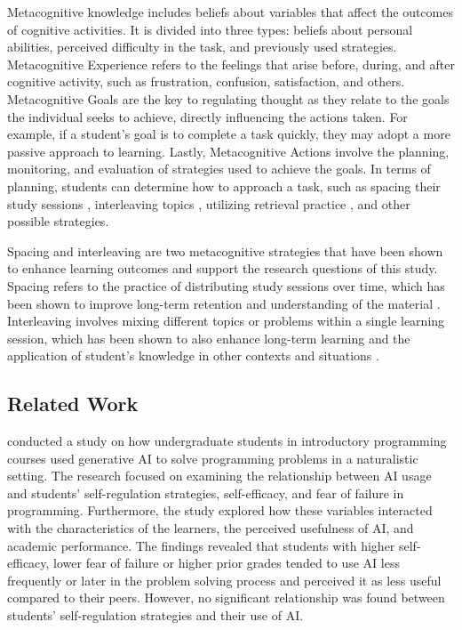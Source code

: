 \documentclass[a4paper,twoside]{article}
\begin{document}
Metacognitive knowledge includes beliefs about variables that affect the
outcomes of cognitive activities. It is divided into three types: beliefs about
personal abilities, perceived difficulty in the task, and previously used
strategies. Metacognitive Experience refers to the feelings that arise before,
during, and after cognitive activity, such as frustration, confusion,
satisfaction, and others. Metacognitive Goals are the key to regulating thought
as they relate to the goals the individual seeks to achieve, directly
influencing the actions taken. For example, if a student’s goal is to complete
a task quickly, they may adopt a more passive approach to learning. Lastly,
Metacognitive Actions involve the planning, monitoring, and evaluation of
strategies used to achieve the goals. In terms of planning, students can
determine how to approach a task, such as spacing their study sessions
\citep{Ouhao18, Carvalho20}, interleaving topics \citep{Rivers21}, utilizing
retrieval practice \citep{larsen18}, and other possible strategies.

Spacing and interleaving are two metacognitive strategies that have been shown
to enhance learning outcomes and support the research questions of this study.
Spacing refers to the practice of distributing study sessions over time, which
has been shown to improve long-term retention and understanding of the material
\citep{Carvalho20}. Interleaving involves mixing different topics or problems
within a single learning session, which has been shown to also enhance long-term
learning and the application of student's knowledge in other contexts and
situations \citep{Rivers21}.

\subsection{Related Work}

\cite{Margulieux24} conducted a study on how undergraduate students in
introductory programming courses used generative AI to solve programming
problems in a naturalistic setting. The research focused on examining the
relationship between AI usage and students’ self-regulation strategies,
self-efficacy, and fear of failure in programming. Furthermore, the study
explored how these variables interacted with the characteristics of the learners,
the perceived usefulness of AI, and academic performance. The findings revealed
that students with higher self-efficacy, lower fear of failure or higher prior
grades tended to use AI less frequently or later in the problem solving process
and perceived it as less useful compared to their peers. However, no significant
relationship was found between students’ self-regulation strategies and their
use of AI.
\end{document}
